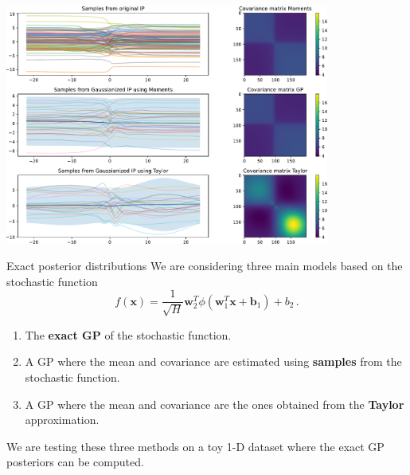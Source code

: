     \begin{frame}
        \begin{center}
            \includegraphics[width=0.8\textwidth]{imgs/GP_taylor.pdf}
        \end{center}
    \end{frame}

    \begin{frame}{Exact posterior distributions}
        We are considering three main models based on the stochastic function 
        \[
            f(\mathbf x) = \frac{1}{\sqrt{H}}\bm w_2^T \phi(\bm w_1^T \mathbf x + \bm b_1) + b_2\,.
        \]
        \begin{enumerate}
            \item The \textbf{exact GP} of the stochastic function.
            \item A GP where the mean and covariance are estimated using \textbf{samples} from the stochastic function.
            \item A GP where the mean and covariance are the ones obtained from the \textbf{Taylor} approximation.
        \end{enumerate}

        We are testing these three methods on a toy 1-D dataset where the exact GP posteriors can be computed.
    \end{frame}

